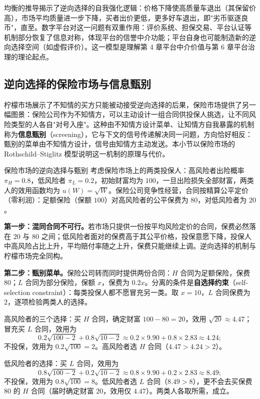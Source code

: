 均衡的推导揭示了逆向选择的自我强化逻辑：价格下降使高质量车退出（其保留价高），市场平均质量进一步下降，买者出价更低，更多好车退出，即"劣币驱逐良币"，直至。数字平台对这一问题有双重作用：评价系统、担保交易、平台认证等机制部分恢复了信息对称，体现平台的信誉中介功能；平台自身也可能制造新的逆向选择空间（如虚假评价）。这一模型是理解第 4 章平台中介价值与第 6 章平台治理的理论起点。
\subsection{逆向选择的保险市场与信息甄别}

柠檬市场展示了不知情的买方只能被动接受逆向选择的后果，保险市场提供了另一幅图景：保险公司作为不知情方，可以主动设计一组合同供投保人挑选，让不同风险类型的人各自"对号入座"。这种由不知情方设计菜单、让知情方自我暴露的机制称为\textbf{信息甄别}（screening），它与下文的信号传递解决同一问题，方向恰好相反：甄别的菜单由不知情方设计，信号由知情方主动发送。本小节以保险市场的 Rothschild--Stiglitz 模型说明这一机制的原理与代价。

\begin{derivation}{保险市场的逆向选择与甄别}{}
考虑保险市场上的两类投保人：高风险者出险概率 $\pi_H = 0.8$，低风险者 $\pi_L = 0.2$，初始财富均为 $100$，一旦出险损失全部财富，两类人的效用函数均为 $u(W) = \sqrt{W}$。保险公司竞争性经营，合同按精算公平定价（零利润）：足额保险（保额 $100$）对高风险者的公平保费为 $80$，对低风险者为 $20$。

\textbf{第一步：混同合同不可行。}若市场只提供一份按平均风险定价的合同，保费必然落在 $20$ 与 $80$ 之间；低风险者面对的保费高于其公平价格，投保意愿下降，投保人中高风险占比上升，平均赔付率随之上升，保费只能继续上调。逆向选择的机制与柠檬市场完全同构。

\textbf{第二步：甄别菜单。}保险公司转而同时提供两份合同：$H$ 合同为足额保险，保费 $80$；$L$ 合同为部分保险，保额 $x$，保费为 $0.2x$。分离的条件是\textbf{自选择约束}（self-selection constraint）：每类投保人都不愿冒充另一类。取 $x = 10$，$L$ 合同保费为 $2$，逐项检验两类人的选择。

高风险者的三个选择：买 $H$ 合同，确定财富 $100 - 80 = 20$，效用 $\sqrt{20} \approx 4.47$；冒充买 $L$ 合同，效用为
\[
0.2\sqrt{100 - 2} + 0.8\sqrt{10 - 2} \approx 0.2 \times 9.90 + 0.8 \times 2.83 \approx 4.24;
\]
不投保，效用为 $0.2\sqrt{100} = 2$。高风险者选 $H$ 合同（$4.47 > 4.24 > 2$）。

低风险者的选择：买 $L$ 合同，效用为
\[
0.8\sqrt{100 - 2} + 0.2\sqrt{10 - 2} \approx 0.8 \times 9.90 + 0.2 \times 2.83 \approx 8.49;
\]
不投保，效用为 $0.8\sqrt{100} = 8$。低风险者选 $L$ 合同（$8.49 > 8$），更不会去买保费 $80$ 的 $H$ 合同（届时确定财富 $20$，效用仅 $4.47$）。两类人各取所需，成立。
\end{derivation}

